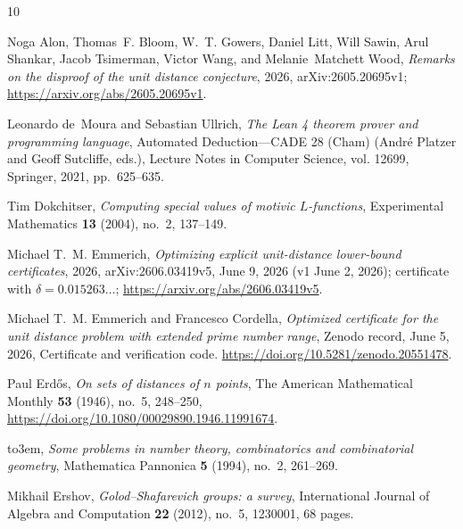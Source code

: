 \documentclass[11pt]{amsart}
\numberwithin{equation}{section}
\theoremstyle{definition}
\theoremstyle{remark}
\begin{document}

\providecommand{\bysame}{\leavevmode\hbox to3em{\hrulefill}\thinspace}
\providecommand{\MR}{\relax\ifhmode\unskip\space\fi MR }
\providecommand{\MRhref}[2]{%
  \href{http://www.ams.org/mathscinet-getitem?mr=#1}{#2}
}
\providecommand{\href}[2]{#2}
\begin{thebibliography}{10}

Noga Alon, Thomas~F. Bloom, W.~T. Gowers, Daniel Litt, Will Sawin, Arul
  Shankar, Jacob Tsimerman, Victor Wang, and Melanie~Matchett Wood,
  \emph{Remarks on the disproof of the unit distance conjecture}, 2026,
  arXiv:2605.20695v1; \url{https://arxiv.org/abs/2605.20695v1}.

Leonardo de~Moura and Sebastian Ullrich, \emph{The {Lean 4} theorem prover and
  programming language}, Automated Deduction---CADE 28 (Cham) (Andr{\'e}
  Platzer and Geoff Sutcliffe, eds.), Lecture Notes in Computer Science, vol.
  12699, Springer, 2021, pp.~625--635.

Tim Dokchitser, \emph{Computing special values of motivic {$L$}-functions},
  Experimental Mathematics \textbf{13} (2004), no.~2, 137--149.

Michael T.~M. Emmerich, \emph{Optimizing explicit unit-distance lower-bound
  certificates}, 2026, arXiv:2606.03419v5, June 9, 2026 (v1 June 2, 2026);
  certificate with $\delta=0.015263\ldots$;
  \url{https://arxiv.org/abs/2606.03419v5}.

Michael T.~M. Emmerich and Francesco Cordella, \emph{Optimized certificate for
  the unit distance problem with extended prime number range}, Zenodo record,
  June 5, 2026, Certificate and verification code.
  \url{https://doi.org/10.5281/zenodo.20551478}.

Paul Erd{\H{o}}s, \emph{On sets of distances of $n$ points}, The American
  Mathematical Monthly \textbf{53} (1946), no.~5, 248--250,
  \url{https://doi.org/10.1080/00029890.1946.11991674}.

\bysame, \emph{Some problems in number theory, combinatorics and combinatorial
  geometry}, Mathematica Pannonica \textbf{5} (1994), no.~2, 261--269.

Mikhail Ershov, \emph{{Golod--Shafarevich} groups: a survey}, International
  Journal of Algebra and Computation \textbf{22} (2012), no.~5, 1230001, 68
  pages.


\end{thebibliography}
\end{document}
